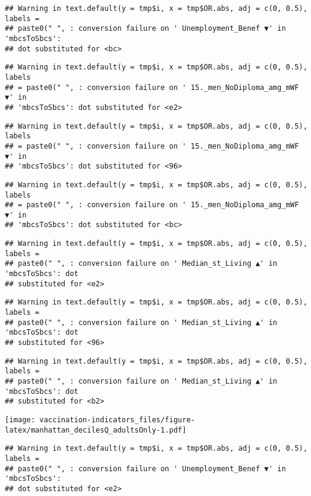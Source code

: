 \documentclass[
]{article}
\begin{document}
\begin{verbatim}
## Warning in text.default(y = tmp$i, x = tmp$OR.abs, adj = c(0, 0.5), labels =
## paste0(" ", : conversion failure on ' Unemployment_Benef ▼' in 'mbcsToSbcs':
## dot substituted for <bc>
\end{verbatim}

\begin{verbatim}
## Warning in text.default(y = tmp$i, x = tmp$OR.abs, adj = c(0, 0.5), labels
## = paste0(" ", : conversion failure on ' 15._men_NoDiploma_amg_mWF ▼' in
## 'mbcsToSbcs': dot substituted for <e2>
\end{verbatim}

\begin{verbatim}
## Warning in text.default(y = tmp$i, x = tmp$OR.abs, adj = c(0, 0.5), labels
## = paste0(" ", : conversion failure on ' 15._men_NoDiploma_amg_mWF ▼' in
## 'mbcsToSbcs': dot substituted for <96>
\end{verbatim}

\begin{verbatim}
## Warning in text.default(y = tmp$i, x = tmp$OR.abs, adj = c(0, 0.5), labels
## = paste0(" ", : conversion failure on ' 15._men_NoDiploma_amg_mWF ▼' in
## 'mbcsToSbcs': dot substituted for <bc>
\end{verbatim}

\begin{verbatim}
## Warning in text.default(y = tmp$i, x = tmp$OR.abs, adj = c(0, 0.5), labels =
## paste0(" ", : conversion failure on ' Median_st_Living ▲' in 'mbcsToSbcs': dot
## substituted for <e2>
\end{verbatim}

\begin{verbatim}
## Warning in text.default(y = tmp$i, x = tmp$OR.abs, adj = c(0, 0.5), labels =
## paste0(" ", : conversion failure on ' Median_st_Living ▲' in 'mbcsToSbcs': dot
## substituted for <96>
\end{verbatim}

\begin{verbatim}
## Warning in text.default(y = tmp$i, x = tmp$OR.abs, adj = c(0, 0.5), labels =
## paste0(" ", : conversion failure on ' Median_st_Living ▲' in 'mbcsToSbcs': dot
## substituted for <b2>
\end{verbatim}

\texttt{[image: vaccination-indicators\_files/figure-latex/manhattan\_decilesQ\_adultsOnly-1.pdf]}

\begin{verbatim}
## Warning in text.default(y = tmp$i, x = tmp$OR.abs, adj = c(0, 0.5), labels =
## paste0(" ", : conversion failure on ' Unemployment_Benef ▼' in 'mbcsToSbcs':
## dot substituted for <e2>
\end{verbatim}
\end{document}
